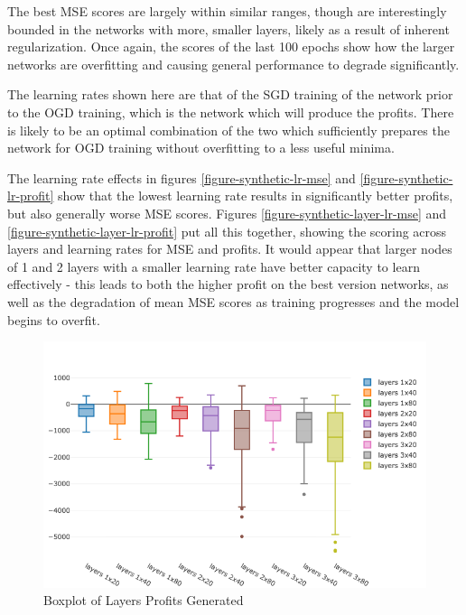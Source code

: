 \documentclass[a4paper,latin]{paper}
\begin{document}
The best MSE scores are largely within similar ranges, though are interestingly bounded in the networks with more, smaller layers, likely as a result of inherent regularization. Once again, the scores of the last 100 epochs show how the larger networks are overfitting and causing general performance to degrade significantly. \newline

The learning rates shown here are that of the SGD training of the network prior to the OGD training, which is the network which will produce the profits. There is likely to be an optimal combination of the two which sufficiently prepares the network for OGD training without overfitting to a less useful minima.\newline

The learning rate effects in figures \ref{figure-synthetic-lr-mse} and \ref{figure-synthetic-lr-profit} show that the lowest learning rate results in significantly better profits, but also generally worse MSE scores. Figures \ref{figure-synthetic-layer-lr-mse} and \ref{figure-synthetic-layer-lr-profit} put all this together, showing the scoring across layers and learning rates for MSE and profits. It would appear that larger nodes of 1 and 2 layers with a smaller learning rate have better capacity to learn effectively - this leads to both the higher profit on the best version networks, as well as the degradation of mean MSE scores as training progresses and the model begins to overfit.
		
\begin{figure}[H]
	\centering \includegraphics[scale=0.5]{images/synthetic_results/bp_layers_profit.png}
	\caption{Boxplot of Layers Profits Generated}
	\label{figure-synthetic-layer-profit}
\end{figure}
\end{document}
